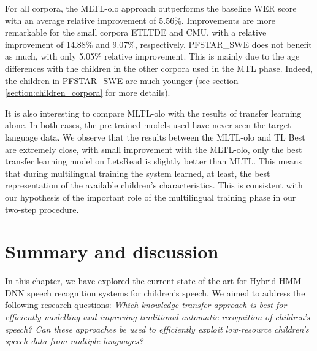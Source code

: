 For all corpora, the \ac{MLTL-olo} approach outperforms the baseline \ac{WER} score with an average relative improvement of 5.56\%. Improvements are more remarkable for the small corpora ETLTDE and CMU, with a relative improvement of 14.88\% and 9.07\%, respectively. PFSTAR\_SWE does not benefit as much, with only 5.05\% relative improvement. This is mainly due to the age differences with the children in the other corpora used in the \ac{MTL} phase. Indeed, the children in PFSTAR\_SWE are much younger (see section  \ref{section:children_corpora} for more details). %

It is also interesting to compare \ac{MLTL-olo} with the results of transfer learning alone. In both cases, the pre-trained models used have never seen the target language data. We observe that the results between the \ac{MLTL-olo} and \ac{TL} Best are extremely close, with small improvement with the \ac{MLTL-olo}, only the best transfer learning model on LetsRead is slightly better than \ac{MLTL}. This means that during multilingual training the system learned, at least, the best representation of the available children's characteristics. This is consistent with our hypothesis of the important role of the multilingual training phase in our two-step procedure.

\section{Summary and discussion}
In this chapter, we have explored the current state of the art for Hybrid \ac{HMM-DNN} speech recognition systems for children's speech. We aimed to address the following research questions: \textit{Which knowledge transfer approach is best for efficiently modelling and improving traditional automatic recognition of children's speech? Can these approaches be used to efficiently exploit low-resource children's speech data from multiple languages?}

